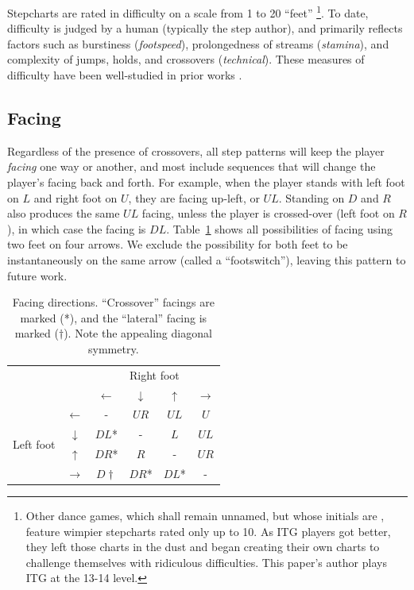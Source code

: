 \documentclass[10pt]{sigplanconf}
\begin{document}
Stepcharts are rated in difficulty on a scale from 1 to 20 ``feet'' \cite{simplylove}\footnote{
Other dance games, which shall remain unnamed, but whose initials are \cite{konami}, feature wimpier stepcharts rated only up to 10. As ITG players got better, they left those charts in the dust and began creating their own charts to challenge themselves with ridiculous difficulties. This paper's author plays ITG at the 13-14 level.}.
To date, difficulty is judged by a human (typically the step author), and primarily reflects factors such as burstiness ({\em footspeed}), prolongedness of streams ({\em stamina}), and complexity of jumps, holds, and crossovers ({\em technical}).
These measures of difficulty have been well-studied in prior works \cite{teamdragonforce,callofthehound,dawgsinthehouse}.

\subsection{Facing}

Regardless of the presence of crossovers, all step patterns will keep the player {\em facing} one way or another, and most include sequences that will change the player's facing back and forth.
For example, when the player stands with left foot on $L$ and right foot on $U$, they are facing up-left, or $UL$. Standing on $D$ and $R$ also produces the same $UL$ facing, unless the player is crossed-over (left foot on $R$), in which case the facing is $DL$.
Table~\ref{tab:facing} shows all possibilities of facing using two feet on four arrows.
We exclude the possibility for both feet to be instantaneously on the same arrow (called a ``footswitch''), leaving this pattern to future work.

\begin{table}[h]
	\begin{center}
	\begin{tabular}{cc|cccc}
		& & \multicolumn{4}{c}{Right foot} \\
		& & $\leftarrow$ & $\downarrow$ & $\uparrow$ & $\rightarrow$ \\
		\hline
		\multirow{4}{*}{Left foot}
		& $\leftarrow$  & - & $UR$ & $UL$ & $U$ \\
		& $\downarrow$  & $DL$* & - & $L$ & $UL$ \\
		& $\uparrow$    & $DR$* & $R$ & - & $UR$ \\
		& $\rightarrow$ & $D\dagger$ & $DR$* & $DL$* & - \\

	\end{tabular}
	\end{center}
	\caption{Facing directions. ``Crossover'' facings are marked (*), and the ``lateral'' facing is marked ($\dagger$). Note the appealing diagonal symmetry.}
	\label{tab:facing}
\end{table}
\end{document}
